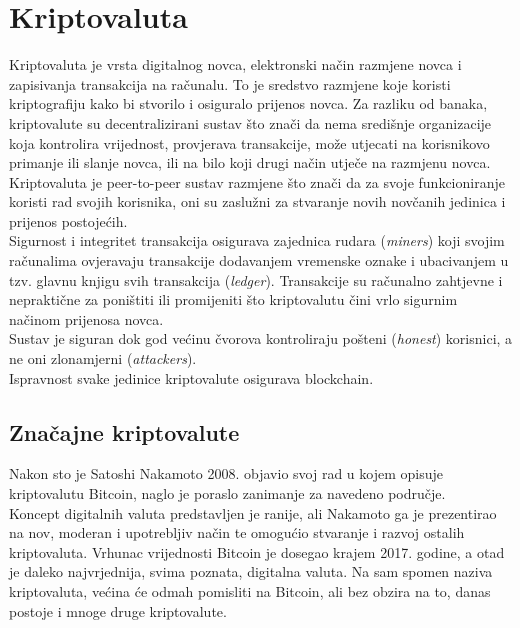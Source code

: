 \documentclass[12pt]{article}
\begin{document}
\section{Kriptovaluta}
Kriptovaluta je vrsta digitalnog novca, elektronski način razmjene novca i zapisivanja transakcija na računalu. To je sredstvo razmjene koje koristi kriptografiju kako bi stvorilo i osiguralo prijenos novca. Za razliku od banaka, kriptovalute su decentralizirani sustav što znači da nema središnje organizacije koja kontrolira vrijednost, provjerava transakcije, može utjecati na korisnikovo primanje ili slanje novca, ili na bilo koji drugi način utječe na razmjenu novca. Kriptovaluta je peer-to-peer sustav razmjene što znači da za svoje funkcioniranje koristi rad svojih korisnika, oni su zaslužni za stvaranje novih novčanih jedinica i prijenos postojećih.\\
Sigurnost i integritet transakcija osigurava zajednica rudara (\textit{miners}) koji svojim računalima ovjeravaju transakcije dodavanjem vremenske oznake i ubacivanjem u tzv. glavnu knjigu svih transakcija (\textit{ledger}). Transakcije su računalno zahtjevne i nepraktične za poništiti ili promijeniti što kriptovalutu čini vrlo sigurnim načinom prijenosa novca.\cite{cryptocurrency} \\
Sustav je siguran dok god većinu čvorova kontroliraju pošteni (\textit{honest}) korisnici, a ne oni zlonamjerni (\textit{attackers}). \\
Ispravnost svake jedinice kriptovalute osigurava blockchain.

\subsection{Značajne kriptovalute}
Nakon sto je Satoshi Nakamoto 2008. objavio svoj rad u kojem opisuje kriptovalutu Bitcoin, naglo je poraslo zanimanje za navedeno područje.\cite{bitcoin} \\
Koncept digitalnih valuta predstavljen je ranije\cite{b-money}, ali Nakamoto ga je prezentirao na nov, moderan i upotrebljiv način te omogućio stvaranje i razvoj ostalih kriptovaluta. 
Vrhunac vrijednosti Bitcoin je dosegao krajem 2017. godine, a otad je daleko najvrjednija, svima poznata, digitalna valuta. Na sam spomen naziva kriptovaluta, većina će odmah pomisliti na Bitcoin, ali bez obzira na to, danas postoje i mnoge druge kriptovalute.\\
\end{document}
